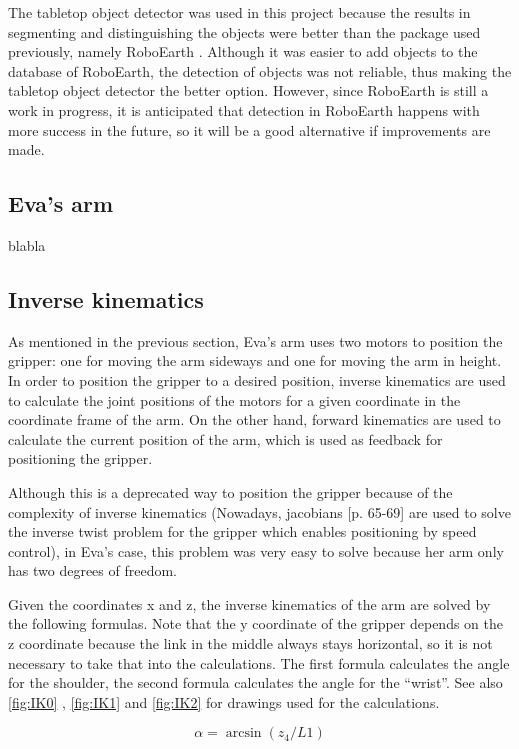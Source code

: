 \documentclass[project_eva.tex]{subfiles}
\begin{document}
The tabletop object detector was used in this project because the results in segmenting and distinguishing the objects were 
better than the package used previously, namely RoboEarth \cite{Roboearth}. Although it was easier to add objects to the 
database of RoboEarth, the detection of objects was not reliable, thus making the tabletop object detector the better 
option. However, since RoboEarth is still a work in progress, it is anticipated that detection in RoboEarth happens with 
more success in the future, so it will be a good alternative if improvements are made.

\subsection*{Eva's arm}
blabla

\subsection*{Inverse kinematics}
As mentioned in the previous section, Eva's arm uses two motors to position the gripper: one for moving the arm sideways 
and one for moving the arm in height. In order to position the gripper to a desired position, inverse kinematics are used 
to calculate the joint positions of the motors for a given coordinate in the coordinate frame of the arm. On the other 
hand, forward kinematics are used to calculate the current position of the arm, which is used as feedback for positioning 
the gripper. 

Although this is a deprecated way to position the gripper because of the complexity of inverse kinematics  (Nowadays, 
jacobians \cite{jacobian} [p. 65-69] are used to solve the inverse twist 
problem for the gripper which enables positioning by speed control), in Eva's case, this problem was very easy to solve 
because her arm only has two degrees of freedom. 

Given the coordinates x and z, the inverse kinematics of the arm are solved by the following formulas. Note that the y 
coordinate of the gripper depends on the z coordinate because the link in the middle always stays horizontal, so it is not 
necessary to take that into the calculations. The first formula calculates the angle for the shoulder, the second formula 
calculates the angle for the ``wrist''. See also \ref{fig:IK0} , \ref{fig:IK1} and \ref{fig:IK2} for drawings used for the calculations.

\begin{equation*}
\alpha = \arcsin(z_4/L1)
\end{equation*}
\end{document}
